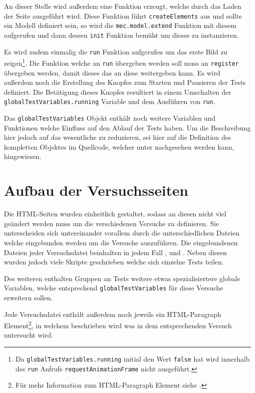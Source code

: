 An dieser Stelle wird au{\ss}erdem eine Funktion erzeugt, welche durch das Laden der Seite ausgeführt wird.
Diese Funktion führt \lstinline{createElements} aus und sollte ein  Modell definiert sein, so wird die \lstinline{mec.model.extend} Funktion mit diesem aufgerufen und dann dessen \lstinline{init} Funktion bemüht um dieses zu instanzieren.

Es wird zudem einmalig die \lstinline{run} Funktion aufgerufen um das erste Bild zu zeigen\footnote{Da \lstinline{globalTestVariables.running} initial den Wert \lstinline{false} hat wird innerhalb des \lstinline{run} Aufrufs \lstinline{requestAnimationFrame} nicht ausgeführt.}.
Die Funktion welche an \lstinline{run} übergeben werden soll muss an \lstinline{register} übergeben werden, damit dieses das an diese weitergeben kann.
Es wird au{\ss}erdem noch die Erstellung des Knopfes zum Starten und Pausieren der Tests definiert.
Die Betätigung dieses Knopfes resultiert in einem Umschalten der \lstinline{globalTestVariables.running} Variable und dem Ausführen von \lstinline{run}.

Das \lstinline{globalTestVariables} Objekt enthält noch weitere Variablen und Funktionen welche Einfluss auf den Ablauf der Tests haben.
Um die Beschreibung hier jedoch auf das wesentliche zu reduzieren, sei hier auf die Definition des kompletten Objektes im Quellcode, welcher unter  nachgesehen werden kann, hingewiesen.

\section{Aufbau der Versuchsseiten}\label{ch:aufbau_der_testseiten}

Die HTML-Seiten wurden einheitlich gestaltet, sodass an diesen nicht viel geändert werden muss um die verschiedenen Versuche zu definieren.
Sie unterscheiden sich untereinander vorallem durch die unterschiedlichen Dateien welche eingebunden werden um die Versuche auszuführen.
Die eingebundenen Dateien jeder Versuchsdatei beinhalten in jedem Fall ,  und .
Neben diesen wurden jedoch viele Skripte geschrieben welche sich einzelne Tests teilen.

Des weiteren enthalten Gruppen an Tests weitere etwas spezialisiertere globale Variablen, welche entsprechend \lstinline{globalTestVariables} für diese Versuche erweitern sollen.

Jede Versuchsdatei enthält au{\ss}erdem noch jeweils ein HTML-Paragraph Element\footnote{Für mehr Information zum HTML-Paragraph Element siehe .}, 
in welchem beschrieben wird was in dem entsprechenden Versuch untersucht wird.

